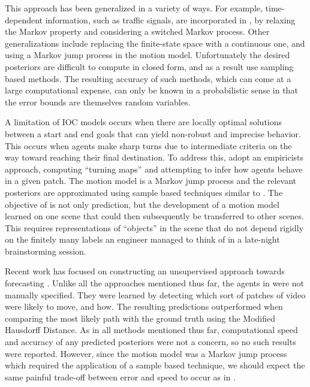 \documentclass[letterpaper,10pt,conference]{ieeeconf}
\begin{document}
This approach has been generalized in a variety of ways.
For example, time-dependent information, such as traffic signals, are incorporated in \cite{Karasev2016}, by relaxing the Markov property and considering a switched Markov process.
Other generalizations include replacing the finite-state space with a continuous one, and using a Markov jump process in the motion model.
Unfortunately the desired posteriors are difficult to compute in closed form, and as a result use sampling based methods.
The resulting accuracy of such methods, which can come at a large computational expense, can only be known in a probabilistic sense in that the error bounds are themselves random variables.

A limitation of IOC models occurs when there are locally optimal solutions between a start and end goals that can yield non-robust and imprecise behavior.
This occurs when agents make sharp turns due to intermediate criteria on the way toward reaching their final destination.
To address this, \cite{Ballan2016} adopt an empiricists approach, computing ``turning maps'' and attempting to infer how agents behave in a given patch.
The motion model is a Markov jump process and the relevant posteriors are approximated using sample based techniques similar to \cite{Karasev2016}.
The objective of \cite{Ballan2016} is not only prediction, but the development of a motion model learned on one scene that could then subsequently be transferred to other scenes. 
This requires representations of ``objects'' in the scene that do not depend rigidly on the finitely many labels an engineer managed to think of in a late-night brainstorming session.

Recent work has focused on constructing an unsupervised approach towards forecasting  \cite{Walker2014}.
Unlike all the approaches mentioned thus far, the agents in \cite{Walker2014} were not manually specified.
They were learned by detecting which sort of patches of video were likely to move, and how.
The resulting predictions outperformed \cite{Kitani2012} when comparing the most likely path with the ground truth using the Modified Hausdorff Distance.
As in all methods mentioned thus far, computational speed and accuracy of any predicted posteriors were not a concern, so no such results were reported.
However, since the motion model was a Markov jump process which required the application of a sample based technique, we should expect the same painful trade-off between error and speed to occur as in \cite{Karasev2016,Ballan2016}.
\end{document}
